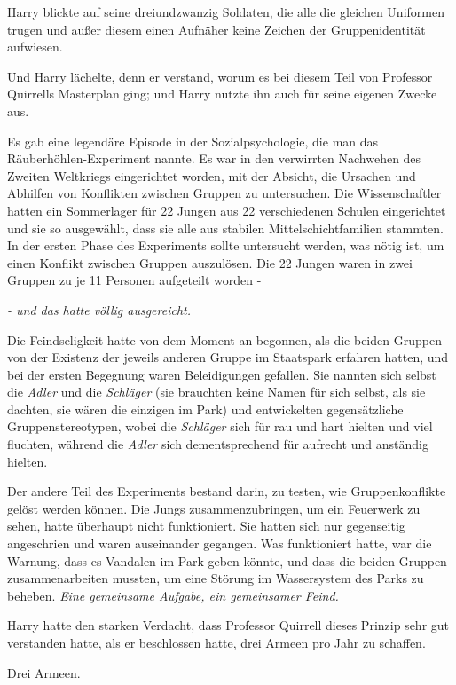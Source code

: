 Harry blickte auf seine dreiundzwanzig Soldaten, die alle die gleichen Uniformen
trugen und außer diesem einen Aufnäher keine Zeichen der Gruppenidentität
aufwiesen.

Und Harry lächelte, denn er verstand, worum es bei diesem Teil von Professor
Quirrells Masterplan ging; und Harry nutzte ihn auch für seine eigenen Zwecke
aus.

Es gab eine legendäre Episode in der Sozialpsychologie, die man das
Räuberhöhlen-Experiment nannte. Es war in den verwirrten Nachwehen des Zweiten
Weltkriegs eingerichtet worden, mit der Absicht, die Ursachen und Abhilfen von
Konflikten zwischen Gruppen zu untersuchen. Die Wissenschaftler hatten ein
Sommerlager für 22 Jungen aus 22 verschiedenen Schulen eingerichtet und sie so
ausgewählt, dass sie alle aus stabilen Mittelschichtfamilien stammten. In der
ersten Phase des Experiments sollte untersucht werden, was nötig ist, um einen
Konflikt zwischen Gruppen auszulösen. Die 22 Jungen waren in zwei Gruppen zu je
11 Personen aufgeteilt worden -

\emph{- und das hatte völlig ausgereicht.}

Die Feindseligkeit hatte von dem Moment an begonnen, als die beiden Gruppen von
der Existenz der jeweils anderen Gruppe im Staatspark erfahren hatten, und bei
der ersten Begegnung waren Beleidigungen gefallen. Sie nannten sich selbst die
\emph{Adler} und die \emph{Schläger} (sie brauchten keine Namen für sich selbst,
als sie dachten, sie wären die einzigen im Park) und entwickelten gegensätzliche
Gruppenstereotypen, wobei die \emph{Schläger} sich für rau und hart hielten und
viel fluchten, während die \emph{Adler} sich dementsprechend für aufrecht und
anständig hielten.

Der andere Teil des Experiments bestand darin, zu testen, wie Gruppenkonflikte
gelöst werden können. Die Jungs zusammenzubringen, um ein Feuerwerk zu sehen,
hatte überhaupt nicht funktioniert. Sie hatten sich nur gegenseitig angeschrien
und waren auseinander gegangen. Was funktioniert hatte, war die Warnung, dass es
Vandalen im Park geben könnte, und dass die beiden Gruppen zusammenarbeiten
mussten, um eine Störung im Wassersystem des Parks zu beheben. \emph{Eine
gemeinsame Aufgabe, ein gemeinsamer Feind.}

Harry hatte den starken Verdacht, dass Professor Quirrell dieses Prinzip sehr
gut verstanden hatte, als er beschlossen hatte, drei Armeen pro Jahr zu
schaffen.

Drei Armeen.

